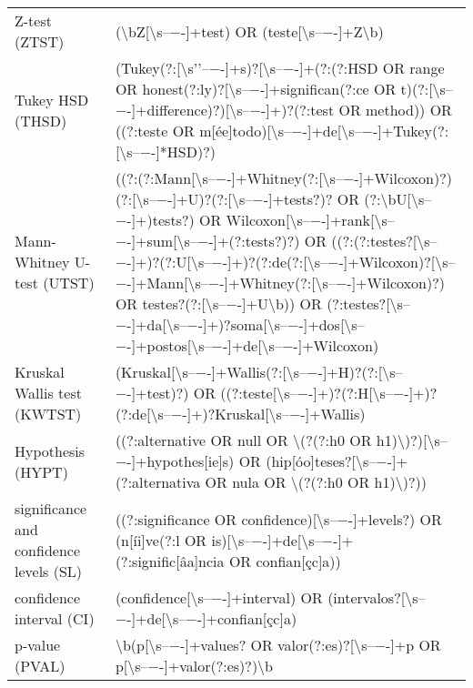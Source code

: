 \begin{table}
\begin{tabular}{ll}
Z-test (ZTST) & (\textbackslash bZ[\textbackslash s–−-]+test) OR (teste[\textbackslash s–−-]+Z\textbackslash b) \\
Tukey HSD (THSD) & (Tukey(?:[\textbackslash s'’–−-]+s)?[\textbackslash s–−-]+(?:(?:HSD OR range OR honest(?:ly)?[\textbackslash s–−-]+significan(?:ce OR t)(?:[\textbackslash s–−-]+difference)?)[\textbackslash s–−-]+)?(?:test OR method)) OR ((?:teste OR m[ée]todo)[\textbackslash s–−-]+de[\textbackslash s–−-]+Tukey(?:[\textbackslash s–−-]*HSD)?) \\
Mann-Whitney U-test (UTST) & ((?:(?:Mann[\textbackslash s–−-]+Whitney(?:[\textbackslash s–−-]+Wilcoxon)?)(?:[\textbackslash s–−-]+U)?(?:[\textbackslash s–−-]+tests?)? OR (?:\textbackslash bU[\textbackslash s–−-]+)tests?) OR Wilcoxon[\textbackslash s–−-]+rank[\textbackslash s–−-]+sum[\textbackslash s–−-]+(?:tests?)?) OR ((?:(?:testes?[\textbackslash s–−-]+)?(?:U[\textbackslash s–−-]+)?(?:de(?:[\textbackslash s–−-]+Wilcoxon)?[\textbackslash s–−-]+Mann[\textbackslash s–−-]+Whitney(?:[\textbackslash s–−-]+Wilcoxon)?) OR testes?(?:[\textbackslash s–−-]+U\textbackslash b)) OR (?:testes?[\textbackslash s–−-]+da[\textbackslash s–−-]+)?soma[\textbackslash s–−-]+dos[\textbackslash s–−-]+postos[\textbackslash s–−-]+de[\textbackslash s–−-]+Wilcoxon) \\
Kruskal Wallis test (KWTST) & (Kruskal[\textbackslash s–−-]+Wallis(?:[\textbackslash s–−-]+H)?(?:[\textbackslash s–−-]+test)?) OR ((?:teste[\textbackslash s–−-]+)?(?:H[\textbackslash s–−-]+)?(?:de[\textbackslash s–−-]+)?Kruskal[\textbackslash s–−-]+Wallis) \\
Hypothesis (HYPT) & ((?:alternative OR null OR \textbackslash (?(?:h0 OR h1)\textbackslash )?)[\textbackslash s–−-]+hypothes[ie]s) OR (hip[óo]teses?[\textbackslash s–−-]+(?:alternativa OR nula OR \textbackslash (?(?:h0 OR h1)\textbackslash )?)) \\
significance and confidence levels (SL) & ((?:significance OR confidence)[\textbackslash s–−-]+levels?) OR (n[íi]ve(?:l OR is)[\textbackslash s–−-]+de[\textbackslash s–−-]+(?:signific[âa]ncia OR confian[çc]a)) \\
confidence interval (CI) & (confidence[\textbackslash s–−-]+interval) OR (intervalos?[\textbackslash s–−-]+de[\textbackslash s–−-]+confian[çc]a) \\
p-value (PVAL) & \textbackslash b(p[\textbackslash s–−-]+values? OR valor(?:es)?[\textbackslash s–−-]+p OR p[\textbackslash s–−-]+valor(?:es)?)\textbackslash b \\
\end{tabular}
\end{table}
